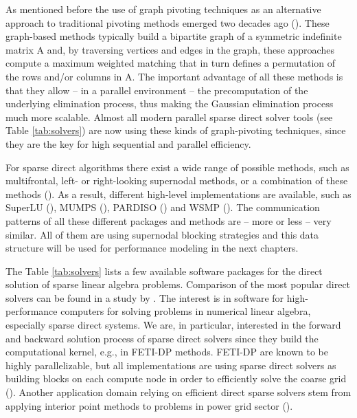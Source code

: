 As mentioned before the use of graph pivoting techniques as an alternative approach to traditional pivoting methods emerged two decades ago (\cite{schenk-2004}). These graph-based methods
typically build a bipartite graph of a symmetric indefinite matrix A and, by traversing vertices and edges in the graph, these approaches compute a maximum weighted matching that
in turn defines a permutation of the rows and/or columns in A. The important advantage of
all these methods is that they allow -- in a parallel environment -- the precomputation of the
underlying elimination process, thus making the Gaussian elimination process much more
scalable. Almost all modern parallel sparse direct solver tools (see Table \ref{tab:solvers})
are now using these kinds of graph-pivoting techniques, since they are the key for high sequential and parallel efficiency.

For sparse direct algorithms there exist a wide range of possible methods, such as multifrontal, left- or right-looking supernodal methods, or a combination of these methods (\cite{doi:10.1137/1.9780898718881}). As a result, different high-level implementations are available, such as SuperLU (\cite{superlu_dist}), MUMPS (\cite{amestoy:2000:mpd}), PARDISO (\cite{schenk-2004,schenk-2006,Bollhofer2020}) and WSMP (\cite{gup02}). The communication patterns of all these different packages and methods are -- more or less -- very similar. All of them are using supernodal blocking strategies and this data structure will be used for performance modeling in the next chapters.

The Table \ref{tab:solvers} lists a few available software packages for the direct solution of sparse linear algebra problems. {\color{blue} Comparison of the most popular direct solvers can be found in a study by \cite{10.1145/1236463.1236465}.} The interest is in software for high-performance computers for solving problems in numerical linear algebra, especially sparse direct systems.
We are, in particular, interested in the forward and backward solution process of sparse direct solvers since they build the computational kernel, e.g., in FETI-DP methods. FETI-DP are known to be highly parallelizable, but all implementations are using sparse direct solvers as building blocks on each compute node in order to efficiently solve the coarse grid (\cite{ISI:000471881700007,ISI:000469334300010,klawonn-fetidp}).
{\color{blue} Another application domain relying on efficient direct sparse solvers stem from applying interior point methods to problems in power grid sector (\cite{8846109}).}

